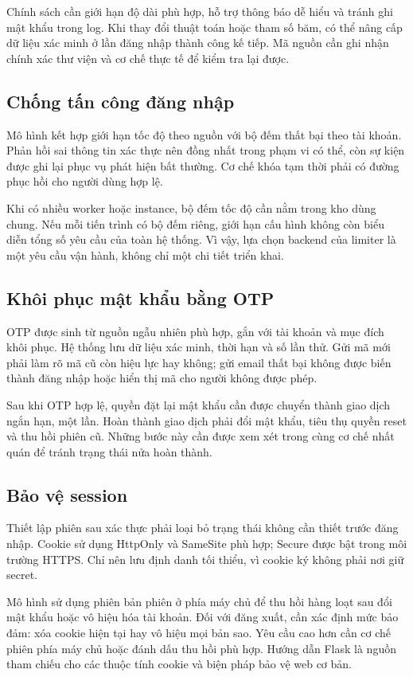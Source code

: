 Chính sách cần giới hạn độ dài phù hợp, hỗ trợ thông báo dễ hiểu và tránh ghi mật khẩu trong log. Khi thay đổi thuật toán hoặc tham số băm, có thể nâng cấp dữ liệu xác minh ở lần đăng nhập thành công kế tiếp. Mã nguồn cần ghi nhận chính xác thư viện và cơ chế thực tế để kiểm tra lại được.
\subsection{Chống tấn công đăng nhập}
Mô hình kết hợp giới hạn tốc độ theo nguồn với bộ đếm thất bại theo tài khoản. Phản hồi sai thông tin xác thực nên đồng nhất trong phạm vi có thể, còn sự kiện được ghi lại phục vụ phát hiện bất thường. Cơ chế khóa tạm thời phải có đường phục hồi cho người dùng hợp lệ.

Khi có nhiều worker hoặc instance, bộ đếm tốc độ cần nằm trong kho dùng chung. Nếu mỗi tiến trình có bộ đếm riêng, giới hạn cấu hình không còn biểu diễn tổng số yêu cầu của toàn hệ thống. Vì vậy, lựa chọn backend của limiter là một yêu cầu vận hành, không chỉ một chi tiết triển khai.
\subsection{Khôi phục mật khẩu bằng OTP}
OTP được sinh từ nguồn ngẫu nhiên phù hợp, gắn với tài khoản và mục đích khôi phục. Hệ thống lưu dữ liệu xác minh, thời hạn và số lần thử. Gửi mã mới phải làm rõ mã cũ còn hiệu lực hay không; gửi email thất bại không được biến thành đăng nhập hoặc hiển thị mã cho người không được phép.

Sau khi OTP hợp lệ, quyền đặt lại mật khẩu cần được chuyển thành giao dịch ngắn hạn, một lần. Hoàn thành giao dịch phải đổi mật khẩu, tiêu thụ quyền reset và thu hồi phiên cũ. Những bước này cần được xem xét trong cùng cơ chế nhất quán để tránh trạng thái nửa hoàn thành.
\subsection{Bảo vệ session}
Thiết lập phiên sau xác thực phải loại bỏ trạng thái không cần thiết trước đăng nhập. Cookie sử dụng HttpOnly và SameSite phù hợp; Secure được bật trong môi trường HTTPS. Chỉ nên lưu định danh tối thiểu, vì cookie ký không phải nơi giữ secret.

Mô hình sử dụng phiên bản phiên ở phía máy chủ để thu hồi hàng loạt sau đổi mật khẩu hoặc vô hiệu hóa tài khoản. Đối với đăng xuất, cần xác định mức bảo đảm: xóa cookie hiện tại hay vô hiệu mọi bản sao. Yêu cầu cao hơn cần cơ chế phiên phía máy chủ hoặc đánh dấu thu hồi phù hợp. Hướng dẫn Flask là nguồn tham chiếu cho các thuộc tính cookie và biện pháp bảo vệ web cơ bản.\cite{flask}

